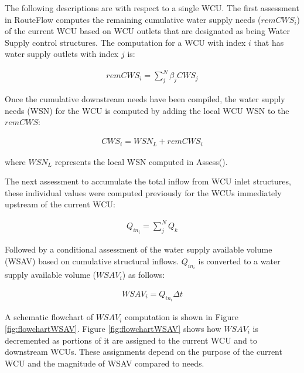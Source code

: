The following descriptions are with respect to a single WCU. The first
assessment in RouteFlow computes the remaining cumulative water supply
needs ($remCWS_i$) of the current WCU based on WCU outlets that are
designated as being Water Supply control structures. The computation
for a WCU with index $i$ that has water supply outlets with index $j$
is:

\begin{align}
  remCWS_i = \sum_j^N \beta _j CWS_j
\end{align}

Once the cumulative downstream needs have been compiled, the water
supply needs (WSN) for the WCU is computed by adding the local WCU WSN
to the $remCWS$:

\begin{align}
  CWS_i = WSN_L + remCWS_i
\end{align}

where $WSN_L$ represents the local WSN computed in Assess(). 

The next assessment to accumulate the total inflow from WCU inlet
structures, these individual values were computed previously for the
WCUs immediately upstream of the current WCU:

\begin{align}
  Q_{in_i} = \sum_j^N Q_k
\end{align}


Followed by a conditional assessment of the water supply available
volume (WSAV) based on cumulative structural inflows. $Q_{in_i}$  is converted to
a water supply available volume ($WSAV_i$) as follows:

\begin{align}
  WSAV_i = Q_{in_i} \Delta t
\end{align}

A schematic flowchart of $WSAV_i$ computation is shown in Figure
\ref{fig:flowchartWSAV}. Figure \ref{fig:flowchartWSAV} shows how
$WSAV_i$ is decremented as portions of it are assigned to the current
WCU and to downstream WCUs. These assignments depend on the purpose of
the current WCU and the magnitude of WSAV compared to needs.

